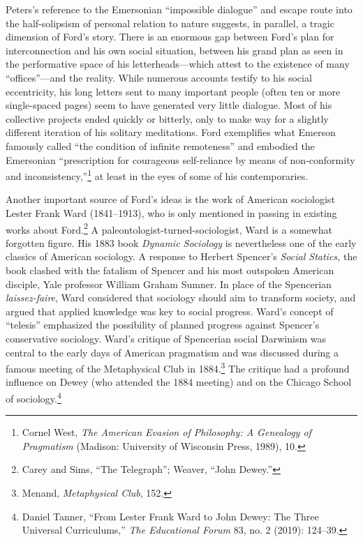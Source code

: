 \documentclass[openany,nobib]{tufte-book}
\begin{document}
Peters's reference to the Emersonian ``impossible dialogue'' and escape
route into the half-solipsism of personal relation to nature suggests,
in parallel, a tragic dimension of Ford's story. There is an enormous
gap between Ford's plan for interconnection and his own social
situation, between his grand plan as seen in the performative space of
his letterheads---which attest to the existence of many
``offices''---and the reality. While numerous accounts testify to his
social eccentricity, his long letters sent to many important people
(often ten or more single-spaced pages) seem to have generated very
little dialogue. Most of his collective projects ended quickly or
bitterly, only to make way for a slightly different iteration of his
solitary meditations. Ford exemplifies what Emerson famously called
``the condition of infinite remoteness'' and embodied the Emersonian
``prescription for courageous self-reliance by means of non-conformity
and inconsistency,''\footnote{Cornel West, \emph{The American Evasion of
  Philosophy: A Genealogy of Pragmatism} (Madison: University of
  Wisconsin Press, 1989), 10.} at least in the eyes of some of his
contemporaries.

Another important source of Ford's ideas is the work of American
sociologist Lester Frank Ward (1841--1913), who is only mentioned in
passing in existing works about Ford.\footnote{Carey and Sims, ``The
  Telegraph''; Weaver, ``John Dewey.''} A
paleontologist-turned-sociologist, Ward is a somewhat forgotten figure.
His 1883 book \emph{Dynamic Sociology} is nevertheless one of the early
classics of American sociology. A response to Herbert Spencer's
\emph{Social Statics,} the book clashed with the fatalism of Spencer and
his most outspoken American disciple, Yale professor William Graham
Sumner. In place of the Spencerian \emph{laissez-faire}, Ward considered
that sociology should aim to transform society, and argued that applied
knowledge was key to social progress. Ward's concept of ``telesis''
emphasized the possibility of planned progress against Spencer's
conservative sociology. Ward's critique of Spencerian social Darwinism
was central to the early days of American pragmatism and was discussed
during a famous meeting of the Metaphysical Club in 1884.\footnote{Menand,
  \emph{Metaphysical Club}, 152.} The critique had a profound influence
on Dewey (who attended the 1884 meeting) and on the Chicago School of
sociology.\footnote{Daniel Tanner, ``From Lester Frank Ward to John
  Dewey: The Three Universal Curriculums,'' \emph{The Educational Forum}
  83, no. 2 (2019): 124--39.}
\end{document}

